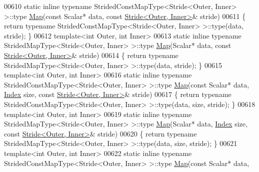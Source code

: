 \begin{DoxyCode}
00610     \textcolor{keyword}{static} \textcolor{keyword}{inline} \textcolor{keyword}{typename} StridedConstMapType<Stride<Outer, Inner> >::type \hyperlink{group___core___module_class_eigen_1_1_map}{Map}(\textcolor{keyword}{const} Scalar* data, \textcolor{keyword}{
      const} \hyperlink{group___core___module_class_eigen_1_1_stride}{Stride<Outer, Inner>}& stride)
00611     \{ \textcolor{keywordflow}{return} \textcolor{keyword}{typename} StridedConstMapType<Stride<Outer, Inner> >::type(data, stride); \}
00612     \textcolor{keyword}{template}<\textcolor{keywordtype}{int} Outer, \textcolor{keywordtype}{int} Inner>
00613     \textcolor{keyword}{static} \textcolor{keyword}{inline} \textcolor{keyword}{typename} StridedMapType<Stride<Outer, Inner> >::type \hyperlink{group___core___module_class_eigen_1_1_map}{Map}(Scalar* data, \textcolor{keyword}{const} 
      \hyperlink{group___core___module_class_eigen_1_1_stride}{Stride<Outer, Inner>}& stride)
00614     \{ \textcolor{keywordflow}{return} \textcolor{keyword}{typename} StridedMapType<Stride<Outer, Inner> >::type(data, stride); \}
00615     \textcolor{keyword}{template}<\textcolor{keywordtype}{int} Outer, \textcolor{keywordtype}{int} Inner>
00616     \textcolor{keyword}{static} \textcolor{keyword}{inline} \textcolor{keyword}{typename} StridedConstMapType<Stride<Outer, Inner> >::type \hyperlink{group___core___module_class_eigen_1_1_map}{Map}(\textcolor{keyword}{const} Scalar* data, 
      \hyperlink{namespace_eigen_a62e77e0933482dafde8fe197d9a2cfde}{Index} size, \textcolor{keyword}{const} \hyperlink{group___core___module_class_eigen_1_1_stride}{Stride<Outer, Inner>}& stride)
00617     \{ \textcolor{keywordflow}{return} \textcolor{keyword}{typename} StridedConstMapType<Stride<Outer, Inner> >::type(data, size, stride); \}
00618     \textcolor{keyword}{template}<\textcolor{keywordtype}{int} Outer, \textcolor{keywordtype}{int} Inner>
00619     \textcolor{keyword}{static} \textcolor{keyword}{inline} \textcolor{keyword}{typename} StridedMapType<Stride<Outer, Inner> >::type \hyperlink{group___core___module_class_eigen_1_1_map}{Map}(Scalar* data, 
      \hyperlink{namespace_eigen_a62e77e0933482dafde8fe197d9a2cfde}{Index} size, \textcolor{keyword}{const} \hyperlink{group___core___module_class_eigen_1_1_stride}{Stride<Outer, Inner>}& stride)
00620     \{ \textcolor{keywordflow}{return} \textcolor{keyword}{typename} StridedMapType<Stride<Outer, Inner> >::type(data, size, stride); \}
00621     \textcolor{keyword}{template}<\textcolor{keywordtype}{int} Outer, \textcolor{keywordtype}{int} Inner>
00622     \textcolor{keyword}{static} \textcolor{keyword}{inline} \textcolor{keyword}{typename} StridedConstMapType<Stride<Outer, Inner> >::type \hyperlink{group___core___module_class_eigen_1_1_map}{Map}(\textcolor{keyword}{const} Scalar* data, 

\end{DoxyCode}
